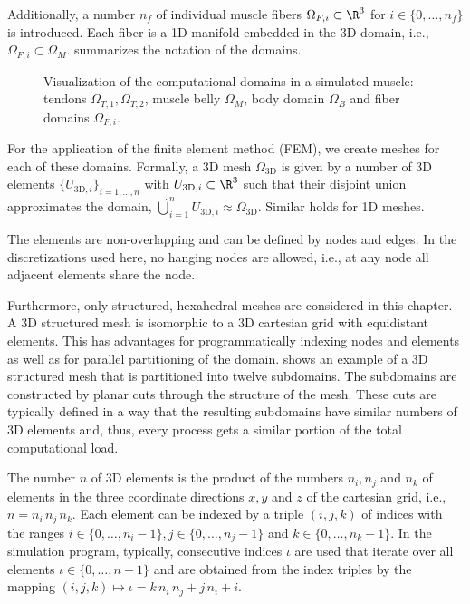 Additionally, a number $n_f$ of individual muscle fibers $\Omega_{F,i} \subset \R^3$ for $i \in \{0,\dots,n_f\}$ is introduced. Each fiber is a 1D manifold embedded in the 3D domain, i.e., $\Omega_{F,i} \subset \Omega_M$.  summarizes the notation of the domains.

\begin{figure}%
    \centering%
    \def\svgwidth{8cm}%
    \caption{Visualization of the computational domains in a simulated muscle: tendons $\Omega_{T,1}, \Omega_{T,2}$, muscle belly $\Omega_M$, body domain $\Omega_B$ and fiber domains $\Omega_{F,i}$.}%
    \label{fig:fibers_domains}%
\end{figure}%

For the application of the finite element method (FEM), we create meshes for each of these domains. Formally, a 3D mesh $\Omega_\text{3D}$ is given by a number of 3D elements $\{U_{\text{3D},i}\}_{i=1,\dots,n}$ with $U_{\text{3D},i} \subset \R^3$ such that their disjoint union approximates the domain,
$\dot{\bigcup}_{i=1}^{n} U_{\text{3D},i} \approx \Omega_\text{3D}$. Similar holds for 1D meshes.

The elements are non-overlapping and can be defined by nodes and edges. In the discretizations used here, no hanging nodes are allowed, i.e., at any node all adjacent elements share the node.

Furthermore, only structured, hexahedral meshes are considered in this chapter.
A 3D structured mesh is isomorphic to a 3D cartesian grid with equidistant elements. 
This has advantages for programmatically indexing nodes and elements as well as for parallel partitioning of the domain.
 shows an example of a 3D structured mesh that is partitioned into twelve subdomains. The subdomains are constructed by planar cuts through the structure of the mesh. These cuts are typically defined in a way that the resulting subdomains have similar numbers of 3D elements and, thus, every process gets a similar portion of the total computational load.

The number $n$ of 3D elements is the product of the numbers $n_i, n_j$ and $n_k$ of elements in the three coordinate directions $x,y$ and $z$ of the cartesian grid,
 i.e., $n = n_i\,n_j\, n_k$.
Each element can be indexed by a triple $(i,j,k)$ of indices with the ranges $i \in \{0,\dots,n_i-1\}, j \in \{0,\dots, n_j-1\}$ and $k \in \{0,\dots,n_k-1\}$. 
In the simulation program, typically, consecutive indices $\iota$ are used that iterate over all elements $\iota \in \{0,\dots,n-1\}$ and are obtained from the index triples by the mapping 
$(i,j,k) \mapsto \iota = k\,n_i\,n_j + j\,n_i + i$.

